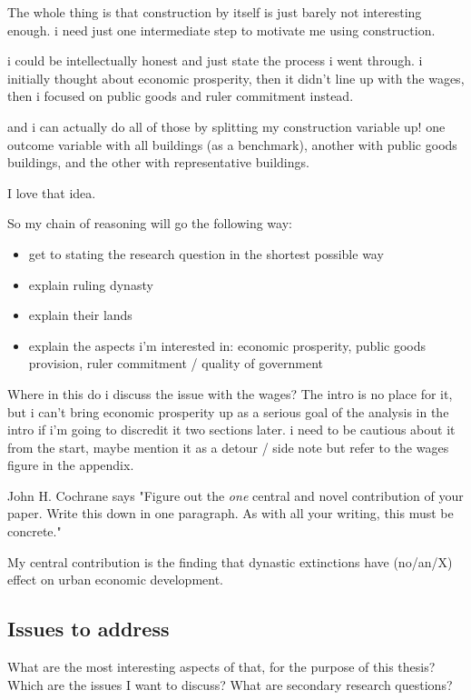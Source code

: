\documentclass{article}
\begin{document}
The whole thing is that construction by itself is just barely not interesting enough. i need just one intermediate step to motivate me using construction.

i could be intellectually honest and just state the process i went through. i initially thought about economic prosperity, then it didn't line up with the wages, then i focused on public goods and ruler commitment instead.

and i can actually do all of those by splitting my construction variable up! one outcome variable with all buildings (as a benchmark), another with public goods buildings, and the other with representative buildings.

I love that idea.

So my chain of reasoning will go the following way:
\begin{itemize}
    \item get to stating the research question in the shortest possible way
    \item explain ruling dynasty
    \item explain their lands
    \item explain the aspects i'm interested in: economic prosperity, public goods provision, ruler commitment / quality of government
\end{itemize}

Where in this do i discuss the issue with the wages? The intro is no place for it, but i can't bring economic prosperity up as a serious goal of the analysis in the intro if i'm going to discredit it two sections later. i need to be cautious about it from the start, maybe mention it as a detour / side note but refer to the wages figure in the appendix.

John H. Cochrane says "Figure out the \textit{one} central and novel contribution of your paper. Write this down in one paragraph. As with all your writing, this must be concrete."

My central contribution is the finding that dynastic extinctions have (no/an/X) effect on urban economic development.


\subsection{Issues to address}

What are the most interesting aspects of that, for the purpose of this thesis? Which are the issues I want to discuss? What are secondary research questions?
\end{document}
